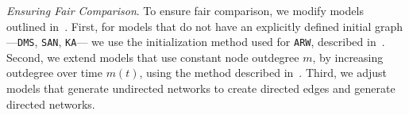 %
%
%
%
%
%
%
%
%

\textit{Ensuring Fair Comparison}. To ensure fair comparison, we modify models outlined in~.
First, for models that do not have an explicitly defined initial graph ---\texttt{DMS}, \texttt{SAN}, \texttt{KA}--- we use the
initialization method used for \texttt{ARW}, described in~. Second, we extend
models that use constant node outdegree $m$, by increasing outdegree over time $m(t)$,
using the method described in~. Third, we adjust models that generate undirected networks to
create directed edges and generate directed networks.

